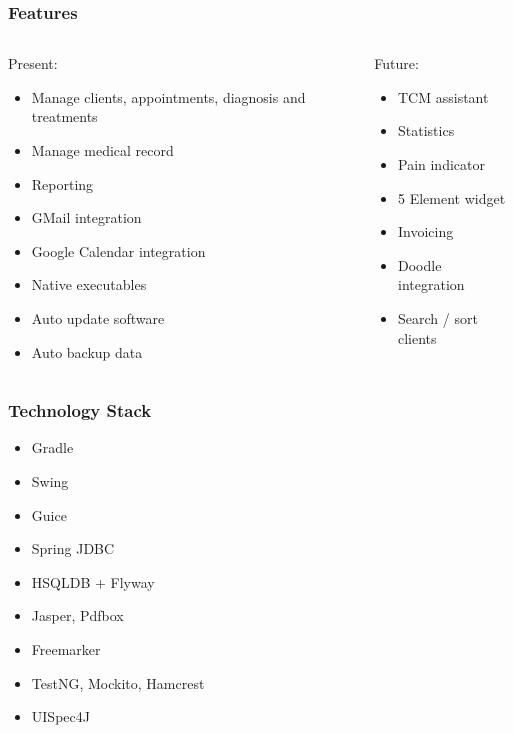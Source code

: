 \begin{frame}[t]
\frametitle{Features}
\begin{columns}[t]
\begin{column}{0.5\textwidth}
	Present:
	\begin{itemize}
		\item Manage clients, appointments, diagnosis and treatments
		\item Manage medical record
		\item Reporting
		\item GMail integration
		\item Google Calendar integration
		\item Native executables
		\item Auto update software
		\item Auto backup data
	\end{itemize}
\end{column}
\begin{column}{0.5\textwidth} 
	Future:
	\begin{itemize}
		\item TCM assistant
		\item Statistics
		\item Pain indicator
		\item 5 Element widget
		\item Invoicing
		\item Doodle integration
		\item Search / sort clients
	\end{itemize}
\end{column}
\end{columns}
\end{frame}

\begin{frame}
\frametitle{Technology Stack}
\begin{itemize}
	\item Gradle
	\item Swing
	\item Guice
	\item Spring JDBC
	\item HSQLDB + Flyway
	\item Jasper, Pdfbox
	\item Freemarker
	\item TestNG, Mockito, Hamcrest
	\item UISpec4J
\end{itemize}

\end{frame}
